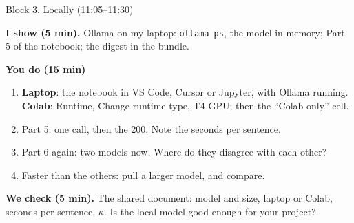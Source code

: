 \begin{frame}{Block 3. Locally (11:05--11:30)}

\small
\textbf{I show (5 min).} Ollama on my laptop: \texttt{ollama ps}, the model in memory; Part 5 of the notebook; the digest in the bundle.

\vspace{0.3cm}

\textbf{You do (15 min)}
\begin{enumerate}
    \setlength{\itemsep}{3pt}
    \item \textbf{Laptop}: the notebook in VS Code, Cursor or Jupyter, with Ollama running. \textbf{Colab}: Runtime, Change runtime type, T4 GPU; then the ``Colab only'' cell.
    \item Part 5: one call, then the 200. Note the seconds per sentence.
    \item Part 6 again: two models now. Where do they disagree with each other?
    \item Faster than the others: pull a larger model, and compare.
\end{enumerate}

\vspace{0.3cm}

\textbf{We check (5 min).} The shared document: model and size, laptop or Colab, seconds per sentence, $\kappa$. Is the local model good enough for your project?

\end{frame}
